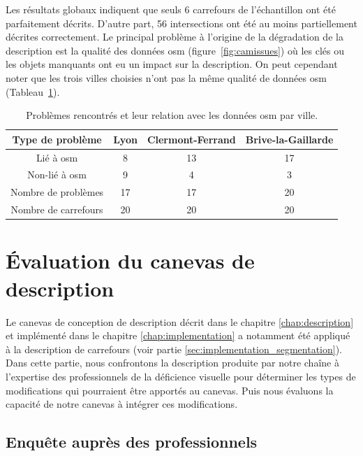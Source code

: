 \newpar{}

Les résultats globaux indiquent que seuls 6 carrefours de l'échantillon ont été parfaitement décrits. D'autre part, 56 intersections ont été au moins partiellement décrites correctement. Le principal problème à l'origine de la dégradation de la description est la qualité des données \gls{osm} (figure~\ref{fig:camissues}) où les clés ou les objets manquants ont eu un impact sur la description. On peut cependant noter que les trois villes choisies n'ont pas la même qualité de données \gls{osm} (Tableau~\ref{tab:osmqualityissues}).

\begin{table}[ht]
    \begin{center}
        \footnotesize
        \begin{tabular}{c | c | c | c }
            Type de problème & Lyon & Clermont-Ferrand & Brive-la-Gaillarde\\
            \hline
            Lié à \gls{osm} & 8  & 13 & 17 \\
            Non-lié à \gls{osm} & 9 & 4 & 3 \\
            \hline
            Nombre de problèmes & 17 & 17 & 20 \\
            Nombre de carrefours & 20 & 20 & 20
        \end{tabular}
        \caption{Problèmes rencontrés et leur relation avec les données \gls{osm} par ville.}
        \label{tab:osmqualityissues}
    \end{center}
\end{table}

\section{Évaluation du canevas de description}

Le canevas de conception de description décrit dans le chapitre \ref{chap:description} et implémenté dans le chapitre \ref{chap:implementation} a notamment été appliqué à la description de carrefours (voir partie \ref{sec:implementation_segmentation}). Dans cette partie, nous confrontons la description produite par notre chaîne à l'expertise des professionnels de la déficience visuelle pour déterminer les types de modifications qui pourraient être apportés au canevas. Puis nous évaluons la capacité de notre canevas à intégrer ces modifications.

\subsection{Enquête auprès des professionnels}

